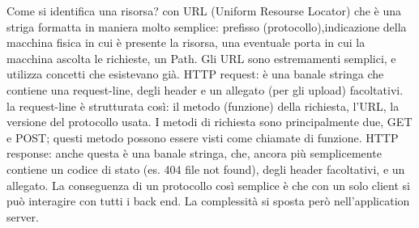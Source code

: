Come si identifica una risorsa? con URL (Uniform Resourse Locator) che è una striga formatta in maniera molto semplice: prefisso (protocollo),indicazione della macchina fisica in cui è presente la risorsa, una eventuale porta in cui la macchina ascolta le richieste, un Path. Gli URL sono estremamenti semplici, e utilizza concetti che esistevano già.\newline
HTTP request: è una banale stringa che contiene una request-line, degli header e un allegato (per gli upload) facoltativi. la request-line è strutturata così: il metodo (funzione) della richiesta, l'URL, la versione del protocollo usata. I metodi di richiesta sono principalmente due, GET e POST; questi metodo possono essere visti come chiamate di funzione.\newline
HTTP response: anche questa è una banale stringa, che, ancora più semplicemente contiene un codice di stato (es. 404 file not found), degli header facoltativi, e un allegato.\newline
La conseguenza di un protocollo così semplice è che con un solo client si può interagire con tutti i back end. La complessità si sposta però nell'application server.\newline
